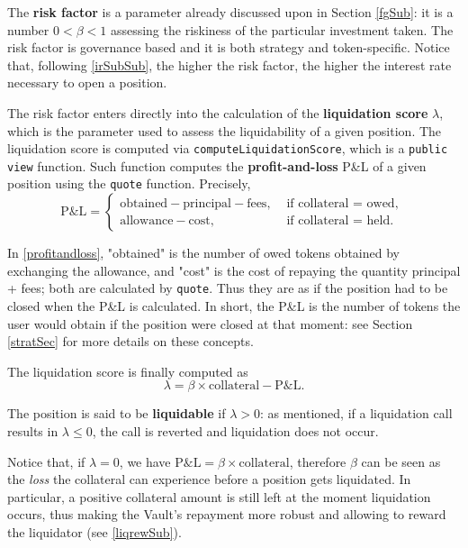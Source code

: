 \documentclass[a4paper,10 pt]{article}
\theoremstyle{definition}
\begin{document}
The {\bf risk factor} is a parameter already discussed upon in Section \ref{fgSub}: it is a number $0 < \beta < 1$ assessing the riskiness of the particular investment taken. The risk factor is governance based and it is both strategy and token-specific. 
Notice that, following \ref{irSubSub}, the higher the risk factor, the higher the interest rate necessary to open a position. 

The risk factor enters directly into the calculation of the {\bf liquidation score} $\lambda$, which is the parameter used to assess the liquidability of a given position. The liquidation score is computed via \verb|computeLiquidationScore|, which is a \verb|public view| function. Such function computes the {\bf profit-and-loss} P\&L of a given position using the \verb|quote| function. Precisely,
\begin{equation}\label{profitandloss}
\text{P\&L} = \begin{cases}
\text{obtained} - \text{principal} - \text{fees}, & \text{ if collateral } = \text{ owed, } \\
\text{allowance} - \text{cost}, & \text{ if collateral } = \text{ held. }
\end{cases} 
\end{equation}

In \eqref{profitandloss}, "obtained" is the number of owed tokens obtained by exchanging the allowance, and "cost" is the cost of repaying the quantity principal + fees; both are calculated by \verb|quote|. Thus they are as if the position had to be closed when the P\&L is calculated. In short, the P\&L is the number of tokens the user would obtain if the position were closed at that moment: see Section \ref{stratSec} for more details on these concepts.

The liquidation score is finally computed as
\begin{equation}\label{liquidationscore}
\lambda = \beta \times \text{collateral} - \text{P\&L}.
\end{equation}

The position is said to be {\bf liquidable} if $\lambda > 0$: as mentioned, if a liquidation call results in $\lambda \le 0$, the call is reverted and liquidation does not occur.

Notice that, if $\lambda = 0$, we have $\text{P\&L} = \beta\times\text{collateral}$, therefore $\beta$ can be seen as the {\it loss} the collateral can experience before a position gets liquidated. In particular, a positive collateral amount is still left at the moment liquidation occurs, thus making the Vault's repayment more robust and allowing to reward the liquidator (see \ref{liqrewSub}).
\end{document}
